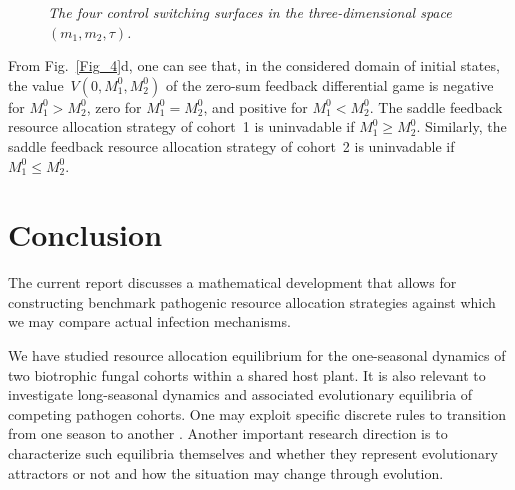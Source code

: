 \documentclass[11pt]{amsart}
\begin{document}
\begin{figure}
\bf \caption{\it The four control switching surfaces in the three-dimensional
space~$ (m_1, m_2, \tau) $.}
\label{Fig_7}
\end{figure}

From Fig.~{\rm \ref{Fig_4}d,} one can see that{\rm ,} in the considered domain
of initial states{\rm ,} the value~$ V \left( 0, M_1^0, M_2^0 \right) $ of
the zero-sum feedback differential game is negative for $ M_1^0 > M_2^0 ${\rm ,}
zero for $ M_1^0 = M_2^0 ${\rm ,} and positive for $ M_1^0 < M_2^0 $. The
saddle feedback resource allocation strategy of cohort~{\rm 1} is uninvadable
if $ M_1^0 \geqslant M_2^0 $. Similarly{\rm ,} the saddle feedback resource
allocation strategy of cohort~{\rm 2} is uninvadable if $ M_1^0
\leqslant M_2^0 $.



\section{Conclusion}

The current report discusses a mathematical development that allows for
constructing benchmark pathogenic resource allocation strategies against which
we may compare actual infection mechanisms.

We have studied resource allocation equilibrium for the one-seasonal dynamics
of two biotrophic fungal cohorts within a shared host plant. It is also relevant
to investigate long-seasonal dynamics and associated evolutionary equilibria of
competing pathogen cohorts. One may exploit specific discrete rules to
transition from one season to another
\cite{MailleretLemesle2009,Akhmetzhanov2012}.
Another important research direction is to characterize such equilibria
themselves and whether they represent evolutionary attractors or not and how the
situation may change through evolution.
\end{document}
